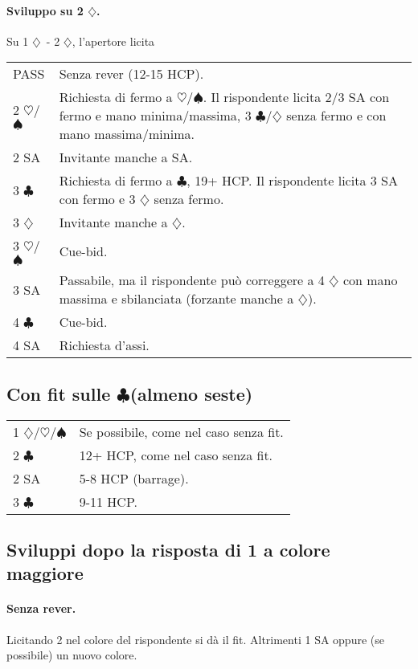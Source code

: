 \documentclass[a4paper,10pt]{article}
\renewcommand{\c}{$\clubsuit$\xspace}
\renewcommand{\d}{$\diamondsuit$\xspace}
\newcommand{\h}{$\heartsuit$\xspace}
\newcommand{\s}{$\spadesuit$\xspace}
\newcommand{\sa}{SA\xspace}
\newcommand{\smallspace}{\vskip0.3cm}
\newenvironment{twocol}
  {\smallspace\noindent\begin{tabular}{l p{0.78\textwidth}}}
  {\end{tabular}\smallspace}
\begin{document}
\paragraph{Sviluppo su 2 \d.}
Su 1 \d\ - 2 \d, l'apertore licita
\begin{twocol}
  PASS & Senza rever (12-15 HCP).\\
  2 \h/\s & Richiesta di fermo a \h/\s. Il rispondente licita 2/3 \sa con fermo e mano minima/massima, 3 \c/\d senza fermo e con mano massima/minima.\\
  2 \sa & Invitante manche a \sa.\\
  3 \c & Richiesta di fermo a \c, 19+ HCP. Il rispondente licita 3 \sa con fermo e 3 \d senza fermo.\\
  3 \d & Invitante manche a \d.\\
  3 \h/\s & Cue-bid.\\
  3 \sa & Passabile, ma il rispondente può correggere a 4 \d con mano massima e sbilanciata (forzante manche a \d).\\
  4 \c & Cue-bid.\\
  4 \sa & Richiesta d'assi.
\end{twocol}



\subsection{Con fit sulle \c (almeno seste)}

\begin{twocol}
 1 \d/\h/\s & Se possibile, come nel caso senza fit.\\
 2 \c & 12+ HCP, come nel caso senza fit.\\
 2 \sa & 5-8 HCP (barrage).\\
 3 \c & 9-11 HCP.\\
\end{twocol}



\subsection{Sviluppi dopo la risposta di 1 a colore maggiore}

\paragraph{Senza rever.} Licitando 2 nel colore del rispondente si dà il fit. Altrimenti 1 \sa oppure (se possibile) un nuovo colore.
\end{document}
